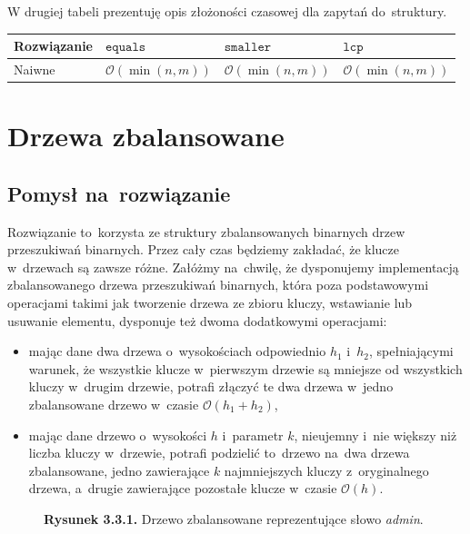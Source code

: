 \documentclass[declaration,shortabstract]{iithesis}
\theoremstyle{definition} \newtheorem{definition}{Definicja}[chapter]
\theoremstyle{remark} \newtheorem{remark}[definition]{Obserwacja}
\theoremstyle{plain} \newtheorem{theorem}[definition]{Twierdzenie}
\theoremstyle{remark} \newtheorem{example}{Przykład}[definition]
\theoremstyle{plain} \newtheorem{lemma}[definition]{Lemat}
\begin{document}
W drugiej tabeli prezentuję opis złożoności czasowej dla zapytań do~struktury.

\begin{center}
    \begin{tabular}{ | m{3cm} | >{\centering\arraybackslash}m{3cm} | >{\centering\arraybackslash}m{3cm} | >{\centering\arraybackslash}m{3cm} | }
        \hline 
        Rozwiązanie & $\texttt{equals}$ & $\texttt{smaller}$ & $\texttt{lcp}$ \\
        \hline
        Naiwne & $\mathcal{O}(\min(n, m))$ & $\mathcal{O}(\min(n, m))$ & $\mathcal{O}(\min(n, m))$ \\
        \hline
    \end{tabular}
\end{center}

\section{Drzewa zbalansowane}

\subsection{Pomysł na~rozwiązanie}

Rozwiązanie to~korzysta ze struktury zbalansowanych binarnych drzew przeszukiwań binarnych. Przez cały czas będziemy zakładać, że klucze w~drzewach są zawsze różne. Załóżmy na~chwilę, że dysponujemy implementacją zbalansowanego drzewa przeszukiwań binarnych, która poza podstawowymi operacjami takimi jak tworzenie drzewa ze zbioru kluczy, wstawianie lub usuwanie elementu, dysponuje też dwoma dodatkowymi operacjami:
\begin{itemize}
    \item mając dane dwa drzewa o~wysokościach odpowiednio $h_1$ i~$h_2$, spełniającymi warunek, że wszystkie klucze w~pierwszym drzewie są mniejsze od wszystkich kluczy w~drugim drzewie, potrafi złączyć te dwa drzewa w~jedno zbalansowane drzewo w~czasie $\mathcal{O}(h_1 + h_2)$,
    \item mając dane drzewo o~wysokości $h$ i~parametr $k$, nieujemny i~nie większy niż liczba kluczy w~drzewie, potrafi podzielić to~drzewo na~dwa drzewa zbalansowane, jedno zawierające $k$ najmniejszych kluczy z~oryginalnego drzewa, a~drugie zawierające pozostałe klucze w~czasie $\mathcal{O}(h)$.
\end{itemize}

\begin{figure}[h]
    \begin{center}
        \caption*{\textbf{Rysunek 3.3.1.} Drzewo zbalansowane reprezentujące słowo \textit{admin}.}
    \end{center}
\end{figure}
\end{document}
